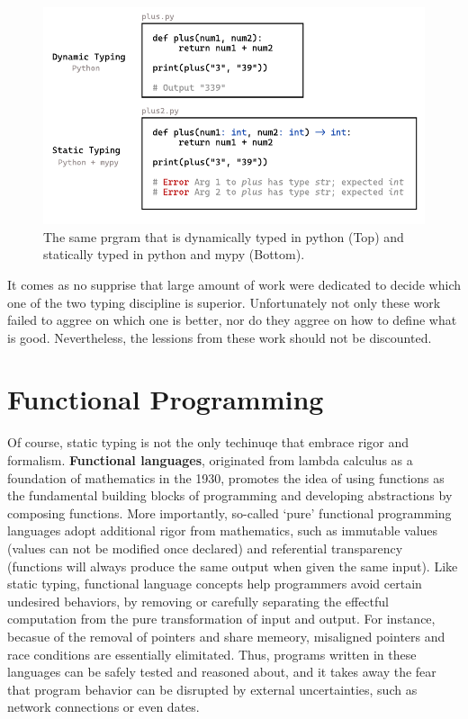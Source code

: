 \begin{figure}[hbt]
  \includegraphics[width=\linewidth]{TypedVsUntyped.pdf}
  \caption{
    \label{fig:typed-vs-untyped}
   The same prgram that is dynamically typed in python (Top) and statically typed in python and mypy (Bottom).
    }
\end{figure}

It comes as no supprise that large amount of work were dedicated to decide which one of the two typing discipline is superior. Unfortunately not only these work failed to aggree on which one is better, nor do they aggree on how to define what is good. Nevertheless, the lessions from these work should not be discounted.  


\section{Functional Programming}
Of course, static typing is not the only techinuqe that embrace rigor and formalism. \textbf{Functional languages}, originated from lambda calculus as a foundation of mathematics in the 1930, promotes the idea of using functions as the fundamental building blocks of programming and developing abstractions by composing functions. 
More importantly, so-called `pure' functional programming languages adopt additional rigor from mathematics, such as immutable values (values can not be modified once declared) and referential transparency (functions will always produce the same output when given the same input).  Like static typing, functional language concepts help programmers avoid certain undesired behaviors, by removing or carefully separating the effectful computation from the pure transformation of input and output.
For instance, becasue of the removal of pointers and share memeory,  misaligned pointers and race conditions are essentially elimitated.
Thus, programs written in these languages can be safely tested and reasoned about, and it takes away the fear that program behavior can be disrupted by external uncertainties, such as network connections or even dates. 


